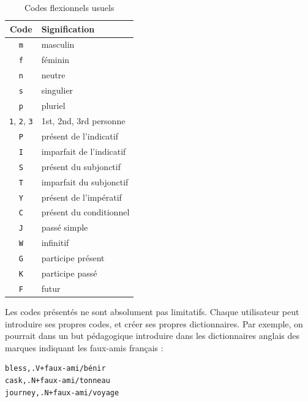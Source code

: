 \begin{table}[!ht]
\begin{center}
\begin{tabular}{|c|l|}
\hline
\textbf{Code} & \textbf{Signification} \\
\hline
\verb+m+ & masculin \\
\hline
\verb+f+ & féminin \\
\hline
\verb+n+ & neutre \\
\hline
\verb+s+ & singulier \\
\hline
\verb+p+ & pluriel \\
\hline
\verb+1+, \verb+2+, \verb+3+ & 1st, 2nd, 3rd personne\\
\hline
\verb+P+ & présent de l’indicatif \\
\hline
\verb+I+ & imparfait de l’indicatif  \\
\hline
\verb+S+ & présent du subjonctif\\
\hline
\verb+T+ & imparfait du subjonctif \\
\hline
\verb+Y+ & présent de l’impératif \\
\hline
\verb+C+ & présent du conditionnel\\
\hline
\verb+J+ & passé simple \\
\hline
\verb+W+ & infinitif \\
\hline
\verb+G+ & participe présent \\
\hline
\verb+K+ & participe passé \\
\hline
\verb+F+ & futur \\
\hline
\end{tabular}
\caption{Codes flexionnels usuels\label{tab-inflectional-codes}}
\end{center}
\end{table}


\bigskip
\noindent Les codes présentés ne sont absolument pas limitatifs. Chaque utilisateur peut introduire
ses propres codes, et créer ses propres dictionnaires. Par exemple, on pourrait dans un but
pédagogique introduire dans les dictionnaires anglais des marques indiquant les faux-amis
français :

\bigskip
\begin{verbatim}
bless,.V+faux-ami/bénir
cask,.N+faux-ami/tonneau
journey,.N+faux-ami/voyage
\end{verbatim}

